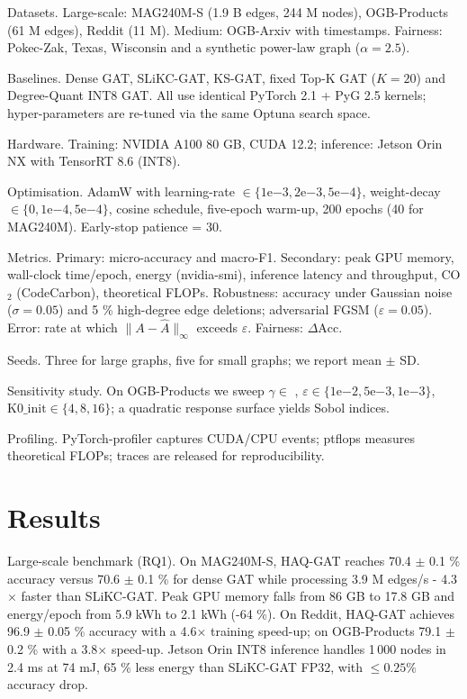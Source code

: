 \documentclass{article} %
\begin{document}
Datasets. Large-scale: MAG240M-S (1.9 B edges, 244 M nodes), OGB-Products (61 M edges), Reddit (11 M). Medium: OGB-Arxiv with timestamps. Fairness: Pokec-Zak, Texas, Wisconsin and a synthetic power-law graph (\(\alpha = 2.5\)).

Baselines. Dense GAT, SLiKC-GAT, KS-GAT, fixed Top-K GAT (\(K = 20\)) and Degree-Quant INT8 GAT. All use identical PyTorch 2.1 + PyG 2.5 kernels; hyper-parameters are re-tuned via the same Optuna search space.

Hardware. Training: NVIDIA A100 80 GB, CUDA 12.2; inference: Jetson Orin NX with TensorRT 8.6 (INT8).

Optimisation. AdamW \cite{kingma-2014-adam} with learning-rate \(\in \{1\mathrm{e}{-3}, 2\mathrm{e}{-3}, 5\mathrm{e}{-4}\}\), weight-decay \(\in \{0, 1\mathrm{e}{-4}, 5\mathrm{e}{-4}\}\), cosine schedule, five-epoch warm-up, 200 epochs (40 for MAG240M). Early-stop patience = 30.

Metrics. Primary: micro-accuracy and macro-F1. Secondary: peak GPU memory, wall-clock time/epoch, energy (nvidia-smi), inference latency and throughput, CO\(_2\) (CodeCarbon), theoretical FLOPs. Robustness: accuracy under Gaussian noise (\(\sigma = 0.05\)) and 5 \% high-degree edge deletions; adversarial FGSM (\(\varepsilon = 0.05\)). Error: rate at which \(\lVert A - \hat{A} \rVert_\infty\) exceeds \(\varepsilon\). Fairness: \(\Delta \mathrm{Acc}\).

Seeds. Three for large graphs, five for small graphs; we report mean \(\pm\) SD.

Sensitivity study. On OGB-Products we sweep \(\gamma \in\) , \(\varepsilon \in \{1\mathrm{e}{-2}, 5\mathrm{e}{-3}, 1\mathrm{e}{-3}\}\), \(\mathrm{K0\_init} \in \{4, 8, 16\}\); a quadratic response surface yields Sobol indices.

Profiling. PyTorch-profiler captures CUDA/CPU events; ptflops measures theoretical FLOPs; traces are released for reproducibility.

\section{Results}
\label{sec:results}
Large-scale benchmark (RQ1). On MAG240M-S, HAQ-GAT reaches 70.4 \(\pm\) 0.1 \% accuracy versus 70.6 \(\pm\) 0.1 \% for dense GAT while processing 3.9 M edges/s - 4.3\(\times\) faster than SLiKC-GAT. Peak GPU memory falls from 86 GB to 17.8 GB and energy/epoch from 5.9 kWh to 2.1 kWh (-64 \%). On Reddit, HAQ-GAT achieves 96.9 \(\pm\) 0.05 \% accuracy with a 4.6\(\times\) training speed-up; on OGB-Products 79.1 \(\pm\) 0.2 \% with a 3.8\(\times\) speed-up. Jetson Orin INT8 inference handles 1\,000 nodes in 2.4 ms at 74 mJ, 65 \% less energy than SLiKC-GAT FP32, with \(\le 0.25 \%\) accuracy drop.
\end{document}
